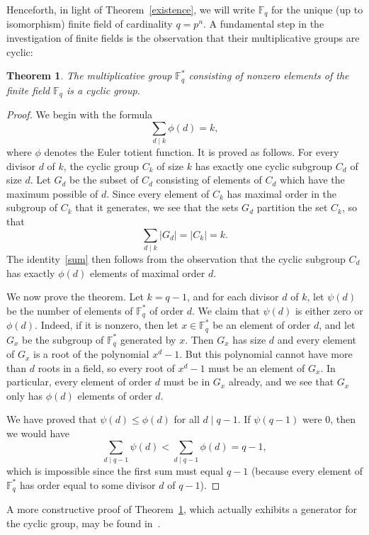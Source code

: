 \documentclass[12pt]{article}
\newcommand{\F}{\mathbb{F}}
\renewcommand{\div}{\mid}
\newtheorem{theorem}{Theorem}[section]
\theoremstyle{definition}
\begin{document}
Henceforth, in light of Theorem~\ref{existence}, we will write $\F_q$
for the unique (up to isomorphism) finite field of cardinality $q =
p^n$. A fundamental step in the investigation of finite fields is the
observation that their multiplicative groups are cyclic:

\begin{theorem}\label{cyclic}
The multiplicative group $\F_q^*$ consisting of nonzero elements of
the finite field $\F_q$ is a cyclic group.
\end{theorem}
\begin{proof}
We begin with the formula
\begin{equation}\label{sum}
\sum_{d \div k} \phi(d) = k,
\end{equation}
where $\phi$ denotes the Euler totient function. It is proved as
follows. For every divisor $d$ of $k$, the cyclic group $C_k$ of size
$k$ has exactly one cyclic subgroup $C_d$ of size $d$. Let $G_d$ be
the subset of $C_d$ consisting of elements of $C_d$ which have the
maximum possible  of $d$. Since every element of $C_k$ has
maximal order in the subgroup of $C_k$ that it generates, we see that
the sets $G_d$ partition the set $C_k$, so that
$$
\sum_{d \div k} |G_d| = |C_k| = k.
$$
The identity~\eqref{sum} then follows from the observation that the
cyclic subgroup $C_d$ has exactly $\phi(d)$ elements of maximal order
$d$.

We now prove the theorem. Let $k = q-1$, and for each divisor $d$ of
$k$, let $\psi(d)$ be the number of elements of $\F_q^*$ of order
$d$. We claim that $\psi(d)$ is either zero or $\phi(d)$. Indeed, if
it is nonzero, then let $x \in \F_q^*$ be an element of order $d$, and
let $G_x$ be the subgroup of $\F_q^*$ generated by $x$. Then $G_x$ has
size $d$ and every element of $G_x$ is a root of the polynomial $x^d -
1$. But this polynomial cannot have more than $d$ roots in a field, so
every root of $x^d - 1$ must be an element of $G_x$. In particular,
every element of order $d$ must be in $G_x$ already, and we see that
$G_x$ only has $\phi(d)$ elements of order $d$.

We have proved that $\psi(d) \leq \phi(d)$ for all $d \div q-1$. If
$\psi(q-1)$ were 0, then we would have
$$
\sum_{d \div q-1} \psi(d) < \sum_{d \div q-1} \phi(d) = q-1,
$$
which is impossible since the first sum must equal $q-1$ (because
every element of $\F_q^*$ has order equal to some divisor $d$ of
$q-1$).
\end{proof}

A more constructive proof of Theorem~\ref{cyclic}, which actually
exhibits a generator for the cyclic group, may be found
in~\cite[Ch. 16]{stewart}.
\end{document}

